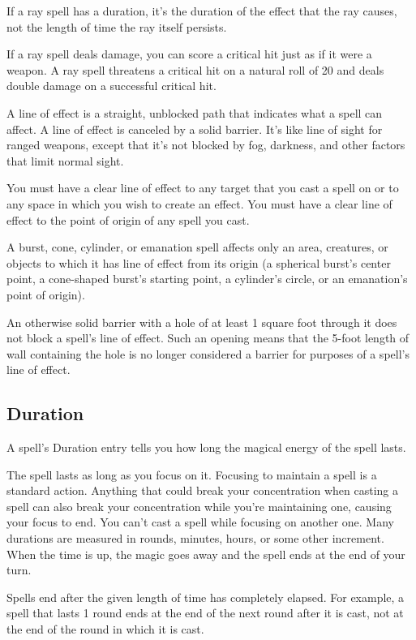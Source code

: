 If a ray spell has a duration, it's the duration of the effect that the ray causes, not the length of time the ray itself persists.

If a ray spell deals damage, you can score a critical hit just as if it were a weapon. A ray spell threatens a critical hit on a natural roll of 20 and deals double damage on a successful critical hit.

 A line of effect is a straight, unblocked path that indicates what a spell can affect. A line of effect is canceled by a solid barrier. It's like line of sight for ranged weapons, except that it's not blocked by fog, darkness, and other factors that limit normal sight.

You must have a clear line of effect to any target that you cast a spell on or to any space in which you wish to create an effect. You must have a clear line of effect to the point of origin of any spell you cast.

A burst, cone, cylinder, or emanation spell affects only an area, creatures, or objects to which it has line of effect from its origin (a spherical burst's center point, a cone-shaped burst's starting point, a cylinder's circle, or an emanation's point of origin).

An otherwise solid barrier with a hole of at least 1 square foot through it does not block a spell's line of effect. Such an opening means that the 5-foot length of wall containing the hole is no longer considered a barrier for purposes of a spell's line of effect.

\subsection{Duration}

A spell's Duration entry tells you how long the magical energy of the spell lasts.

 The spell lasts as long as you focus on it. Focusing to maintain a spell is a standard action. Anything that could break your concentration when casting a spell can also break your concentration while you're maintaining one, causing your focus to end. You can't cast a spell while focusing on another one.
 Many durations are measured in rounds, minutes, hours, or some other increment. When the time is up, the magic goes away and the spell ends at the end of your turn.

Spells end after the given length of time has completely elapsed. For example, a spell that lasts 1 round ends at the end of the next round after it is cast, not at the end of the round in which it is cast.

